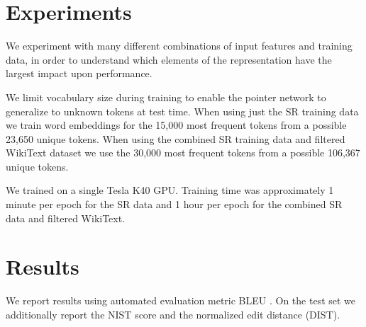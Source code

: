 \documentclass[11pt,a4paper]{article}
\begin{document}





\section{Experiments}


We experiment with many different combinations of input features and training data, in order to understand which elements of the representation have the largest impact upon performance. 

We limit vocabulary size during training to enable the pointer network to generalize to unknown tokens at test time. When using just the SR training data we train word embeddings for the 15,000 most frequent tokens from a possible 23,650 unique tokens. When using the combined SR training data and filtered WikiText dataset we use the 30,000 most frequent tokens from a possible 106,367 unique tokens.

We trained on a single Tesla K40 GPU. Training time was approximately 1 minute per epoch for the SR data and 1 hour per epoch for the combined SR data and filtered WikiText.


\section{Results}

% 
We report results using automated evaluation metric BLEU \citep{Papineni:2002:BMA:1073083.1073135}. On the test set we additionally report the NIST \citep{Przybocki2009} score and the normalized edit distance (DIST).
\end{document}
